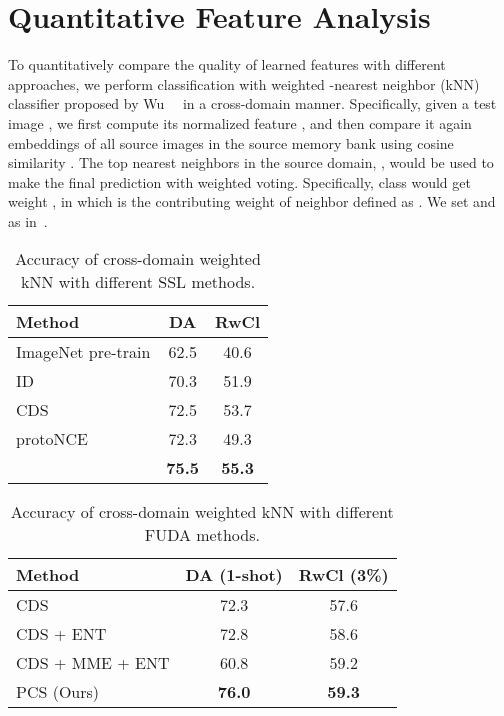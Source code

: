 \documentclass[final]{cvpr}
\newcommand{\Gd}{\rowcolor{gray!45}}
\begin{document}
\section{Quantitative Feature Analysis}

To quantitatively compare the quality of learned features with different approaches, we perform classification with weighted -nearest neighbor (kNN) classifier proposed by Wu~\etal~\cite{wu2018unsupervised} in a cross-domain manner. Specifically, given a test image , we first compute its normalized feature , and then compare it again embeddings of all source images in the source memory bank \bm{} using cosine similarity . The top  nearest neighbors in the source domain, , would be used to make the final prediction with weighted voting. Specifically, class  would get weight , in which  is the contributing weight of neighbor  defined as . We set  and  as in~\cite{wu2018unsupervised}. 


\begin{table}[]
\centering
\caption{Accuracy of cross-domain weighted kNN with different SSL methods.}
\begin{tabular}{lcc}
\toprule
Method & DA & RwCl \\ \midrule
ImageNet pre-train & 62.5 & 40.6 \\
ID~\cite{wu2018unsupervised} & 70.3 & 51.9 \\
CDS~\cite{kim2020cross} & 72.5 & 53.7 \\
protoNCE~\cite{li2020prototypical} & 72.3 & 49.3 \\
\Gd  & \textbf{75.5} & \textbf{55.3} \\ \midrule
\end{tabular}
\label{tab:ssl_feature_analysis}
\end{table}



\begin{table}[t]
\centering
\caption{Accuracy of cross-domain weighted kNN with different FUDA methods.}
\begin{tabular}{lcc}
\toprule
Method & DA (1-shot) & RwCl (3\%) \\ \midrule
CDS~\cite{kim2020cross} & 72.3 & 57.6 \\
CDS + ENT & 72.8 & 58.6 \\
CDS + MME + ENT & 60.8 & 59.2 \\
\Gd PCS (Ours) & \textbf{76.0} & \textbf{59.3} \\ \bottomrule
\end{tabular}
\label{tab:feature_analysis}
\end{table}
\end{document}
